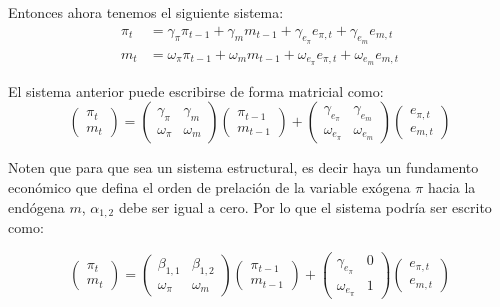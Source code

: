 \documentclass[
]{book}
\begin{document}
Entonces ahora tenemos el siguiente sistema:
\begin{align}
\pi_{t}&=\gamma_{\pi}\pi_{t-1}+\gamma_{m}m_{t-1}+\gamma_{e_{\pi}}e_{\pi,t}+\gamma_{e_{m}}e_{m,t}\\   
 m_{t}&=\omega_{\pi}\pi_{t-1}+\omega_{m}m_{t-1}+\omega_{e_{\pi}}e_{\pi,t}+\omega_{e_{m}}e_{m,t}       
\end{align}

El sistema anterior puede escribirse de forma matricial como:
\begin{equation}
    \left( \begin{array}{c}
    \pi_{t} \\
      m_{t} 
    \end{array}\right)=\left( \begin{array}{cc}
 \gamma_{\pi} & \gamma_{m}\\
 \omega_{\pi} & \omega_{m}
    \end{array}
    \right) \left( \begin{array}{c}
    \pi_{t-1}\\
      m_{t-1}
    \end{array}
    \right) +
\left( \begin{array}{cc}
 \gamma_{e_{\pi}} & \gamma_{e_{m}}\\
 \omega_{e_{\pi}} & \omega_{e_{m}}
    \end{array}
    \right) \left( \begin{array}{c}
    e_{\pi,t}\\
    e_{m,t} 
    \end{array}
    \right) 
\end{equation}

Noten que para que sea un sistema estructural, es decir haya un fundamento económico que defina el orden de prelación de la variable exógena \(\pi\) hacia la endógena \(m\), \(\alpha_{1,2}\) debe ser igual a cero. Por lo que el sistema podría ser escrito como:

\begin{equation}
    \left( \begin{array}{c}
    \pi_{t} \\
      m_{t} 
    \end{array}\right)=\left( \begin{array}{cc}
 \beta_{1,1} & \beta_{1,2}\\
 \omega_{\pi} & \omega_{m}
    \end{array}
    \right) \left( \begin{array}{c}
    \pi_{t-1}\\
      m_{t-1}
    \end{array}
    \right) +
\left( \begin{array}{cc}
 \gamma_{e_{\pi}} & 0\\
 \omega_{e_{\pi}} & 1
    \end{array}
    \right) \left( \begin{array}{c}
    e_{\pi,t}\\
    e_{m,t} 
    \end{array}
    \right) 
\end{equation}
\end{document}
